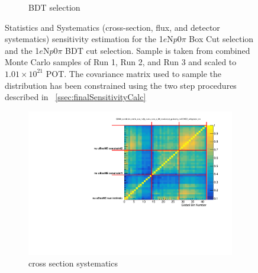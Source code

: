 \documentclass[a4paper]{article}
\newcommand{\npsel}{1$e$N$p$0$\pi$\xspace}
\begin{document}
\begin{figure}[H]
\begin{center}
\begin{subfigure}[b]{0.48\textwidth}
    \label{fig:1eNp_bdt_syst}
    \caption{BDT selection}
    \end{subfigure}
\caption{\label{fig:1eNp:statsystsensitivity} Statistics and Systematics (cross-section, flux, and detector systematics) sensitivity estimation for the \npsel Box Cut selection and the \npsel BDT cut selection. Sample is taken from combined Monte Carlo samples of Run 1, Run 2, and Run 3 and scaled to $1.01\times10^21$ POT. The covariance matrix used to sample the distribution has been constrained using the two step procedures described in ~\cref{ssec:finalSensitivityCalc}}
\end{center}
\end{figure}

\begin{figure}[ht] 
\begin{center}
    \begin{subfigure}[b]{0.45\textwidth}
    \centering
    \includegraphics[width=1.00\textwidth]{Sensitivity/CorrelationMatrices/SBNfit_correlation_matrix_nue_1e0p_numu_reco_e_H0_newboxcut_genieonly_noCCMEC_withpoiserr_mc_withpoiserr_collapsed.pdf}
    \caption{cross section systematics}
    \end{subfigure}
    \begin{subfigure}[b]{0.45\textwidth}
    \centering

\end{subfigure}
\end{center}
\end{figure}
\end{document}
